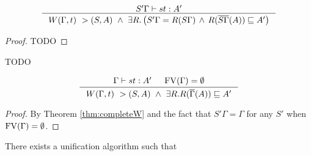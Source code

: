 \begin{theorem}[Completeness of $W$] \label{thm:completeW}
\[ \inference{ S'\Gamma |-s t : A' }{
	W(\Gamma,t) ~> (S,A) ~\land~
	\exists R . \left(
		S'\Gamma = R(S\Gamma) \,\land\,
		R(\overline{S\Gamma}(A))\sqsubseteq A' \right) }
\]
\end{theorem}
\begin{proof}
TODO
\end{proof}
TODO

\begin{corollary}
\[
\inference{ \Gamma |-s t : A' & \FV(\Gamma)=\emptyset }{
	W(\Gamma,t) ~> (S,A) ~\land~
	\exists R.R(\overline{\Gamma}(A))\sqsubseteq A' }
\]
\end{corollary}
\begin{proof} By Theorem \ref{thm:completeW} and the fact that
	$S'\Gamma = \Gamma$ for any $S'$
	when $\mathop{\mathrm{FV}}(\Gamma) = \emptyset$.
\end{proof}

There exists a unification algorithm such that

